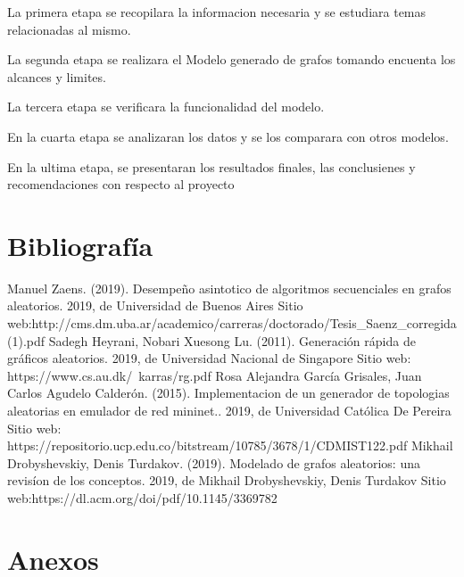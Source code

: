 \documentclass[11pt]{extarticle}
\begin{document}
    La primera etapa se recopilara la informacion necesaria y
    se estudiara temas relacionadas al mismo.\hfill\break

    La segunda etapa se realizara el Modelo generado de grafos tomando
    encuenta los alcances y limites. \hfill\break

    La tercera etapa se verificara la funcionalidad del modelo.
    \hfill\break

    En la cuarta etapa se analizaran los datos y se los comparara con 
    otros modelos.
    \hfill\break

    En la ultima etapa, se presentaran los resultados finales, las
    conclusienes y recomendaciones con respecto al proyecto

\section{Bibliograf\'ia}
  Manuel Zaens. (2019). Desempeño asintotico de algoritmos secuenciales en grafos aleatorios. 2019, de Universidad de Buenos Aires Sitio web:\hfill\break http://cms.dm.uba.ar/academico/carreras/doctorado/Tesis\_Saenz\_corregida(1).pdf \hfill \break
  \break
  Sadegh Heyrani, Nobari Xuesong Lu. (2011). Generaci\'on r\'apida de gr\'aficos aleatorios. 2019, de Universidad Nacional de Singapore Sitio web: https://www.cs.au.dk/~karras/rg.pdf
  \break
  \break
  Rosa Alejandra Garc\'ia Grisales, Juan Carlos Agudelo Calder\'on. (2015). Implementacion de un generador de topologias aleatorias en emulador de red mininet.. 2019, de Universidad Cat\'olica De Pereira Sitio web: https://repositorio.ucp.edu.co/bitstream/10785/3678/1/CDMIST122.pdf
  \break
  \break
  Mikhail Drobyshevskiy, Denis Turdakov. (2019). Modelado de grafos aleatorios: una revis\'ion de los conceptos. 2019, de Mikhail Drobyshevskiy, Denis Turdakov Sitio web:\hfill\break https://dl.acm.org/doi/pdf/10.1145/3369782
\section{Anexos}
\end{document}
